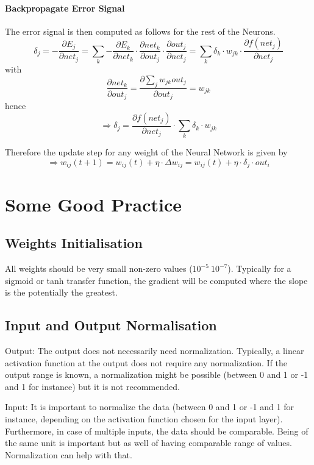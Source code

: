 \documentclass[10pt,a4paper]{article}
\begin{document}
\paragraph{Backpropagate Error Signal} The error signal is then computed as follows for the rest of the Neurons. 
$$
\delta_j = - \frac{\partial E_j}{\partial net_j}
		 = \sum_{k}{- \frac{\partial E_k}{\partial net_k} \cdot
		   \frac{\partial net_k}{\partial out_j} \cdot
		   \frac{\partial out_j}{\partial net_j}}
		 = \sum_{k}{\delta_k \cdot w_{jk} \cdot \frac{\partial f(net_j)}{\partial net_j}}
$$
with 
$$
\frac{\partial net_k}{\partial out_j} = \frac{\partial \sum_{j}{w_{jk}out_j}}{\partial out_j} = w_{jk}
$$
hence
\begin{equation}\label{err_sig_all}
\Rightarrow \boxed{\delta_j = \frac{\partial f(net_j)}{\partial net_j} \cdot \sum_{k}{\delta_k \cdot w_{jk}}}
\end{equation}

Therefore the update step for any weight of the Neural Network is given by
\begin{equation}\label{net_update}
\Rightarrow 
\boxed{ 
	w_{ij}(t+1) = w_{ij}(t) + \eta \cdot \Delta w_{ij} 
				= w_{ij}(t) + \eta \cdot \delta_j \cdot out_i 
}
\end{equation}

\section{Some Good Practice}
\subsection{Weights Initialisation}
All weights should be very small non-zero values ($10^{-5} ~ 10^{-7}$). Typically for a sigmoid or tanh transfer function, the gradient will be computed where the slope is the potentially the greatest. 
\subsection{Input and Output Normalisation}
\begin{list}{•}{}
\item Output: The output does not necessarily need normalization. Typically, a linear activation function at the output does not require any normalization. If the output range is known, a normalization might be possible (between 0 and 1 or -1 and 1 for instance) but it is not recommended. 
\item Input: It is important to normalize the data (between 0 and 1 or -1 and 1 for instance, depending on the activation function chosen for the input layer). Furthermore, in case of multiple inputs, the data should be comparable. Being of the same unit is important but as well of having comparable range of values. Normalization can help with that. 
\end{list}
\end{document}

